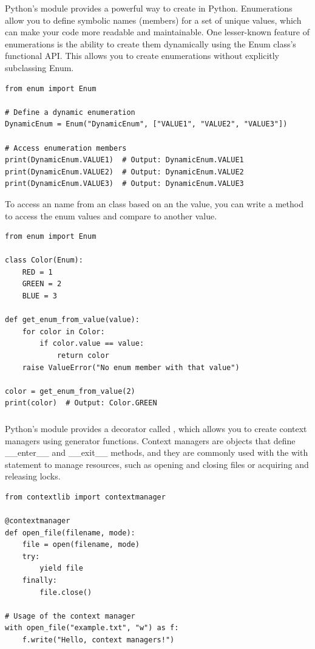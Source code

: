 Python's  module provides a powerful way to create  in Python. Enumerations allow you to define symbolic names (members) for a set of unique values, which can make your code more readable and maintainable. One lesser-known feature of enumerations is the ability to create them dynamically using the Enum class's functional API. This allows you to create enumerations without explicitly subclassing Enum.
\begin{lstlisting}
from enum import Enum

# Define a dynamic enumeration
DynamicEnum = Enum("DynamicEnum", ["VALUE1", "VALUE2", "VALUE3"])

# Access enumeration members
print(DynamicEnum.VALUE1)  # Output: DynamicEnum.VALUE1
print(DynamicEnum.VALUE2)  # Output: DynamicEnum.VALUE2
print(DynamicEnum.VALUE3)  # Output: DynamicEnum.VALUE3
\end{lstlisting}


To access an  name from an  class based on an the value, you can write a method to access the enum values and compare to another value.
\begin{lstlisting}
from enum import Enum

class Color(Enum):
    RED = 1
    GREEN = 2
    BLUE = 3

def get_enum_from_value(value):
    for color in Color:
        if color.value == value:
            return color
    raise ValueError("No enum member with that value")

color = get_enum_from_value(2)
print(color)  # Output: Color.GREEN
\end{lstlisting}






\subsubsection{}

Python's  module provides a decorator called , which allows you to create context managers using generator functions. Context managers are objects that define \_\_enter\_\_ and \_\_exit\_\_ methods, and they are commonly used with the with statement to manage resources, such as opening and closing files or acquiring and releasing locks.
\begin{lstlisting}
from contextlib import contextmanager

@contextmanager
def open_file(filename, mode):
    file = open(filename, mode)
    try:
        yield file
    finally:
        file.close()

# Usage of the context manager
with open_file("example.txt", "w") as f:
    f.write("Hello, context managers!")
\end{lstlisting}

